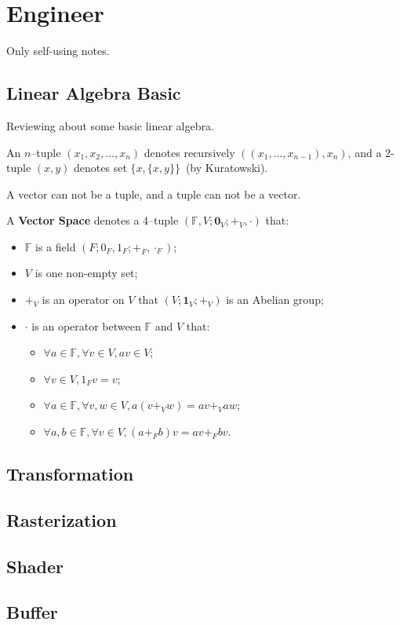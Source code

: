 \section{Engineer}
        Only self-using notes.
        \subsection{Linear Algebra Basic}
            \par Reviewing about some basic linear algebra.
            \begin{definition}
                An \(n\)--tuple \((x_1, x_2, \dots, x_n)\) denotes recursively \(((x_1, \dots, x_{n-1}), x_n)\), and a 2-tuple \((x,y)\) denotes set \(\{x, \{x,y\}\}\)\ (by Kuratowski).
            \end{definition}
            A vector can not be a tuple, and a tuple can not be a vector.
            \begin{definition}
                A \textbf{Vector Space} denotes a 4--tuple \((\mathbb{F}, V; \mathbf{0}_V; +_V, \cdot)\) that:
                    \begin{itemize}
                        \item \(\mathbb{F}\) is a field \((F; 0_F, 1_F; +_F, \cdot_F)\);
                        \item \(V\) is one non-empty set;
                        \item \(+_V\) is an operator on \(V\) that \((V; \mathbf{1}_V; +_V)\) is an Abelian group;
                        \item \(\cdot\) is an operator between \(\mathbb F\) and \(V\) that:
                            \begin{itemize}
                                \item \(\forall a\in\mathbb{F},\forall v\in V, av\in V\);
                                \item \(\forall v\in V, 1_Fv=v\);
                                \item \(\forall a\in\mathbb{F},\forall v,w\in V, a(v+_Vw)=av+_Vaw\);
                                \item \(\forall a,b\in\mathbb{F},\forall v\in V, (a+_Fb)v=av+_Fbv\).
                            \end{itemize}
                    \end{itemize}
            \end{definition}
        \subsection{Transformation}
        \subsection{Rasterization}
        \subsection{Shader}
        \subsection{Buffer}
        